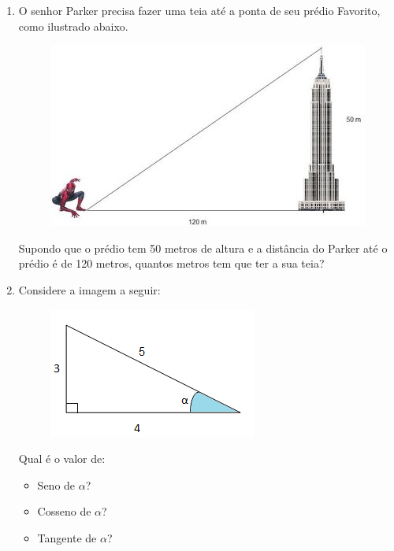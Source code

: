 \documentclass[11pt]{article}
\begin{document}
\begin{enumerate}
	\item O senhor Parker precisa fazer uma teia até a ponta de seu prédio
		Favorito, como ilustrado abaixo.
		\begin{figure}[H]
			\centering
			\includegraphics[width=0.8\linewidth]{imgs/spid.jpg}
		\end{figure}
		Supondo que o prédio tem 50 metros de altura e a distância
		do Parker até o prédio é de 120 metros, quantos metros tem que ter a 
		sua teia?

	\item Considere a imagem a seguir:
		\begin{figure}[H]
			\centering
			\includegraphics[width=0.5\linewidth]{imgs/boa.png}
		\end{figure}
		Qual é o valor de:
		\begin{itemize}
			\item Seno de $\alpha$?
			\item Cosseno de $\alpha$?
			\item Tangente de $\alpha$?
		\end{itemize}
\end{enumerate}

\newpage
\end{document}
